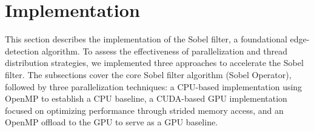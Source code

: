 \section{Implementation}
\label{sec:implementation}

This section describes the implementation of the Sobel filter, a foundational edge-detection algorithm. To assess the effectiveness of parallelization and thread distribution strategies, we implemented three approaches to accelerate the Sobel filter. The subsections cover the core Sobel filter algorithm (Sobel Operator), followed by three parallelization techniques: a CPU-based implementation using OpenMP to establish a CPU baseline, a CUDA-based GPU implementation focused on optimizing performance through strided memory access, and an OpenMP offload to the GPU to serve as a GPU baseline.